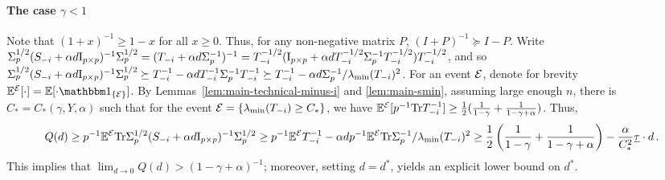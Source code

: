\documentclass[times,sort&compress,3p]{elsarticle}
\begin{document}
\paragraph{The case $\gamma<1$} Note that $(1+x)^{-1}\ge 1-x$ for all $x\ge 0$. Thus, for any non-negative matrix $P$, $(I+P)^{-1}\succeq I-P$. Write $\Sigma_p^{1/2}(S_{-i}+\alpha d \mathrm{I}_{p \times p})^{-1}\Sigma_p^{1/2} 
    = (T_{-i}+\alpha d \Sigma_p^{-1})^{-1} 
    = T_{-i}^{-1/2}(\mathrm{I}_{p \times p} + \alpha d T_{-i}^{-1/2}\Sigma_p^{-1}T_{-i}^{-1/2})T_{-i}^{-1/2}$, and so $\Sigma_p^{1/2}(S_{-i}+\alpha d \mathrm{I}_{p \times p})^{-1}\Sigma_p^{1/2} \succeq T_{-i}^{-1} - \alpha d T_{-i}^{-1}\Sigma_p^{-1} T_{-i}^{-1} 
    \succeq T_{-i}^{-1} - \alpha d \Sigma_p^{-1}/\lambda_{\min}(T_{-i})^2$. 
For an event $\mathcal{E}$, denote for brevity $\E^{\Ec}[\cdot] = \E[\cdot \indic{\Ec}]$. 
By Lemmas~\ref{lem:main-technical-minus-i} and \ref{lem:main-smin}, assuming large enough $n$, there is $C_*=C_*(\gamma,Y,\alpha)$ such that for the event $\mathcal{E}=\{\lambda_{\min}(T_{-i})\ge C_*\}$, we have ${\mathbb{E}}^{\mathcal{E}}[p^{-1}\textrm{Tr} T_{-i}^{-1}] \ge \frac12 (\frac{1}{1-\gamma} + \frac{1}{1-\gamma+\alpha})$. Thus,
\[
Q(d)\ge p^{-1}{\mathbb{E}}^{\mathcal{E}}\textrm{Tr}\Sigma_p^{1/2}(S_{-i}+\alpha d \mathrm{I}_{p \times p})^{-1}\Sigma_p^{1/2} 
\ge p^{-1}{\mathbb{E}}^{\mathcal{E}}T_{-i}^{-1} - \alpha d p^{-1}{\mathbb{E}}^{\mathcal{E}}\textrm{Tr} \Sigma_p^{-1}/\lambda_{\min}(T_{-i})^2
\ge \frac12 \left(\frac{1}{1-\gamma} + \frac{1}{1-\gamma+\alpha}\right) - \frac{\alpha }{C_*^2} \underline{\tau} \cdot d \,.
\]
This implies that $\lim_{d\to 0}Q(d)>(1-\gamma+\alpha)^{-1}$;  moreover,  
setting $d=d^*$, yields an explicit lower bound on $d^*$.
\end{document}
